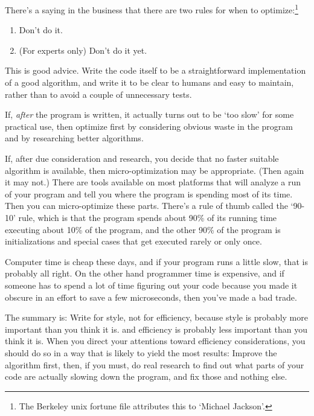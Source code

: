 There's a saying in the business that there are two rules for when to
optimize:\footnote{The Berkeley {\sc unix} fortune file attributes this
to `Michael Jackson'.}

\begin{enumerate}
\item Don't do it.
\item (For experts only)  Don't do it yet.
\end{enumerate}

This is good advice.  Write the code itself to be a straightforward
implementation of a good algorithm, and write it to be clear to humans
and easy to maintain, rather than to avoid a couple of unnecessary
tests.

If, {\em after}\/ the program is written, it actually turns out to be
`too slow' for some practical use, then optimize first by considering
obvious waste in the program and by researching better algorithms.

If, after due consideration and research, you decide that no faster
suitable algorithm is available, then micro-optimization may be
appropriate. (Then again it may not.)  There are tools available on most
platforms that will analyze a run of your program and tell you where the
program is spending most of its time.  Then you can micro-optimize these
parts.  There's a rule of thumb called the `90-10' rule, which is that
the program spends about 90\% of its running time executing about 10\%
of the program, and the other 90\% of the program is initializations and
special cases that get executed rarely or only once.  

Computer time is cheap these days, and if your program runs a little
slow, that is probably all right.  On the other hand programmer time is
expensive, and if someone has to spend a lot of time figuring out your
code because you made it obscure in an effort to save a few
microseconds, then you've made a bad trade.

The summary is: Write for style, not for efficiency, because style is
probably more important than you think it is. and efficiency is probably
less important than you think it is.  When you direct your attentions
toward efficiency considerations, you should do so in a way that is
likely to yield the most results: Improve the algorithm first, then, if
you must, do real research to find out what parts of your code are
actually slowing down the program, and fix those and nothing else.

